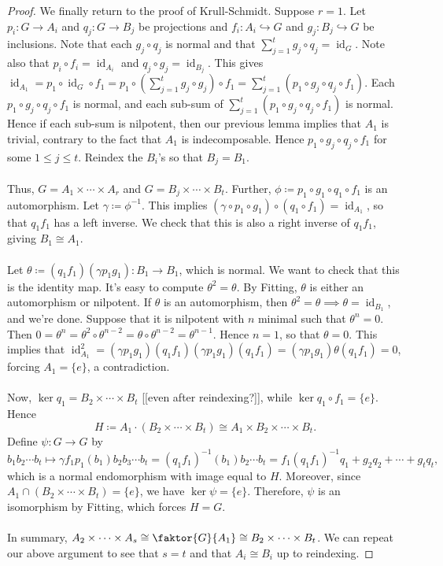 \documentclass[10pt,letterpaper,cm]{nupset}
\theoremstyle{definition}
\newcommand{\1}{\mathbf{1}}
\newcommand{\0}{\vec 0}
\DeclareMathOperator{\id}{id}
\begin{document}
\begin{proof}
We finally return to the proof of Krull-Schmidt. Suppose $r=1$. Let $p_i : G \to A_i$ and $q_j : G \to B_j$ be projections and $f_i : A_i \hookrightarrow G$ and $g_j : B_j \hookrightarrow G$ be inclusions. Note that each $g_j \circ q_j$ is normal and that $\sum_{j=1}^t g_j \circ q_j = \id_G$. Note also that $p_i \circ f_i = \id_{A_i}$ and $q_j \circ g_j = \id_{B_j}$. This gives $\id_{A_1} = p_1 \circ \id_G \circ f_1 = p_1 \circ (\sum_{j=1}^t g_j \circ g_j) \circ f_1 = \sum_{j=1}^t (p_1 \circ g_j \circ q_j \circ f_1)$. Each $p_1 \circ g_j \circ q_j \circ f_1$ is normal, and each sub-sum of $\sum_{j=1}^t (p_1 \circ g_j \circ q_j \circ f_1)$ is normal. Hence if each sub-sum is nilpotent, then our previous lemma implies that $A_1$ is trivial, contrary to the fact that $A_1$ is indecomposable. Hence $ p_1 \circ g_j \circ q_j \circ f_1$ for some $1\leq j \leq t$. Reindex the $B_i$'s so that $B_j = B_1$. 
\\ \\ Thus, $G= A_1 \times \cdots \times A_r$ and $G= B_j \times \cdots \times B_t$. Further, $\phi\coloneqq p_1\circ g_1\circ q_1\circ f_1$ is an automorphism. Let $\gamma\coloneqq  \phi^{-1}$. This implies $(\gamma \circ p_1 \circ g_1)\circ (q_1\circ f_1)=\id_{A_1}$, so that $q_1f_1$ has a left inverse. We check that this is also a right inverse of $q_1f_1$, giving $B_1 \cong A_1$.
\\ \\ Let $\theta \coloneqq  (q_1f_1)(\gamma p_1g_1) : B_1 \to B_1$, which is normal. We want to check that this is the identity map. It's easy to compute $ \theta^2 =  \theta.$
By Fitting, $\theta$ is either an automorphism or nilpotent. If $\theta$ is an automorphism, then $\theta^2 = \theta \implies \theta = \id_{B_1}$, and we're done. Suppose that it is nilpotent with $n$ minimal such that $\theta^n =0$. Then $0 = \theta^n = \theta^2 \circ \theta^{n-2} = \theta \circ \theta^{n-2}= \theta^{n-1}$. Hence $n=1$, so that $\theta =0$. This implies that $\id_{A_1}^2 = (\gamma p_1 g_1)(q_1 f_1)(\gamma p_1 g_1)(q_1 f_1) = (\gamma p_1 g_1)\theta(q_1 f_1) = 0$, forcing $A_1= \{e\}$, a contradiction.
\\ \\
Now, $\ker q_1 = B_2 \times \cdots \times B_t$ {[[even after reindexing?]]}, while $\ker q_1 \circ f_1 = \{e\}$. Hence $$H\coloneqq  A_1 \cdot (B_2 \times \cdots \times B_t) \cong A_1 \times B_2 \times \cdots \times B_t.$$ Define $\psi : G\to G$ by $$b_1b_2\cdots b_t \mapsto \gamma f_1p_1(b_1)b_2b_3\cdots b_t = (q_1f_1)^{-1}(b_1)b_2\cdots b_t= f_1(q_1f_1)^{-1}q_1 + g_2q_2+\cdots + g_tq_t ,$$ which is a normal endomorphism with image equal to $H$. Moreover, since $A_1\cap (B_2 \times \cdots \times B_t) =\{e\}$, we have $\ker \psi =\{e\}$. Therefore, $\psi$ is an isomorphism by Fitting, which forces $H=G$.
\\ \\ In summary, $A_2 \times \cdots \times A_s \cong \faktor{G}{A_1} \cong B_2\times \cdots \times B_t$. We can repeat our above argument to see that $s=t$ and that $A_i \cong B_i$ up to reindexing.
\end{proof}
\end{document}
